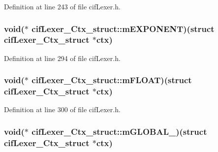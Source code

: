 Definition at line 243 of file cif\-Lexer.\-h.

\hypertarget{structcif_lexer___ctx__struct_a490a85f69c203747fa1e2aedd4218aca}{
\subsubsection[{m\-E\-X\-P\-O\-N\-E\-N\-T}]{\setlength{\rightskip}{0pt plus 5cm}void($\ast$ cif\-Lexer\-\_\-\-Ctx\-\_\-struct\-::m\-E\-X\-P\-O\-N\-E\-N\-T)(struct {\bf cif\-Lexer\-\_\-\-Ctx\-\_\-struct} $\ast$ctx)}}\label{structcif_lexer___ctx__struct_a490a85f69c203747fa1e2aedd4218aca}


Definition at line 294 of file cif\-Lexer.\-h.

\hypertarget{structcif_lexer___ctx__struct_a1c9726425571cdf12596b3206467a076}{
\subsubsection[{m\-F\-L\-O\-A\-T}]{\setlength{\rightskip}{0pt plus 5cm}void($\ast$ cif\-Lexer\-\_\-\-Ctx\-\_\-struct\-::m\-F\-L\-O\-A\-T)(struct {\bf cif\-Lexer\-\_\-\-Ctx\-\_\-struct} $\ast$ctx)}}\label{structcif_lexer___ctx__struct_a1c9726425571cdf12596b3206467a076}


Definition at line 300 of file cif\-Lexer.\-h.

\hypertarget{structcif_lexer___ctx__struct_a029ba397cd601963bc8d8063d7f22e8c}{
\subsubsection[{m\-G\-L\-O\-B\-A\-L\-\_\-}]{\setlength{\rightskip}{0pt plus 5cm}void($\ast$ cif\-Lexer\-\_\-\-Ctx\-\_\-struct\-::m\-G\-L\-O\-B\-A\-L\-\_\-)(struct {\bf cif\-Lexer\-\_\-\-Ctx\-\_\-struct} $\ast$ctx)}}\label{structcif_lexer___ctx__struct_a029ba397cd601963bc8d8063d7f22e8c}


